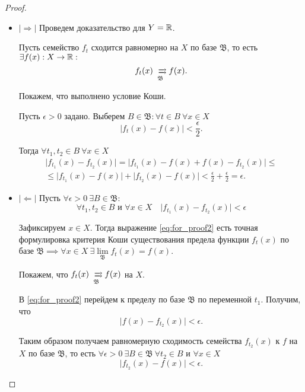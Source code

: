 \begin{proof}\leavevmode
    \begin{itemize}
        \item $ |\Rightarrow| $ Проведем доказательство для $Y = \mathbb{R}$.

              Пусть семейство $f_t$ сходится равномерно на $X$ по базе $\mathfrak{B}$, то есть $\exists f(x): X \rightarrow \mathbb{R}:$
              \[
                  f_t(x) \xrightrightarrows[\mathfrak{B}]{} f(x).
              \]

              Покажем, что выполнено условие Коши.

              Пусть $\epsilon > 0$ задано. Выберем $B \in \mathfrak{B}: \forall t \in B \ \forall x \in X$
              \[
                  \big|f_t(x) - f(x)\big| < \frac{\epsilon}{2}.
              \]

              Тогда $\forall t_1, t_2 \in B \ \forall x \in X$
              \begin{multline*}
                  \big|f_{t_1}(x) - f_{t_2}(x)\big| = \big|f_{t_1}(x) - f(x) + f(x) - f_{t_2}(x)\big| \leqslant \\
                  \leqslant \big|f_{t_1}(x) - f(x)\big| + \big|f_{t_2}(x) - f(x)\big| < \frac{\epsilon}{2} + \frac{\epsilon}{2} = \epsilon.
              \end{multline*}

        \item $ |\Leftarrow| $ Пусть $\forall \epsilon > 0 \ \exists B \in \mathfrak{B}: $
              \begin{equation}\label{eq:for_proof2}
                  \forall t_1,t_2 \in B \text{ и }\forall x \in X \quad \big|f_{t_1}(x) - f_{t_2}(x)\big| < \epsilon
              \end{equation}

              Зафиксируем $x \in X$. Тогда выражение \ref{eq:for_proof2} есть точная формулировка критерия Коши существования предела функции $f_t(x)$ по базе $\mathfrak{B} \implies \forall x \in X \ \exists \underset{\mathfrak{B}}{\lim}f_t(x) = f(x)$.

              Покажем, что $f_t(x) \xrightrightarrows[\mathfrak{B}]{} f(x)$ на $X$.

              В \ref{eq:for_proof2} перейдем к пределу по базе $\mathfrak{B}$ по переменной $t_1$. Получим, что
              \[
                  \big|f(x) - f_{t_2}(x)\big| < \epsilon.
              \]

              Таким образом получаем равномерную сходимость семейства $f_{t_2}(x)$ к $f$ на $X$ по базе $\mathfrak{B}$, то есть $\forall \epsilon > 0 \ \exists B \in \mathfrak{B} \ \forall t_2 \in B$ и $\forall x \in X$
              \[
                  \big|f_{t_2}(x) - f(x)\big| < \epsilon.
              \]
    \end{itemize}
\end{proof}

